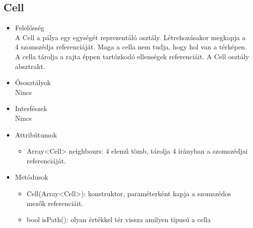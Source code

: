 \subsection{Cell}
\begin{itemize}
\item Felelősség\\
A Cell a pálya egy egységét reprezentáló osztály. Létrehozásakor megkapja a 4 szomszédja referenciáját. Maga a cella nem tudja, hogy hol van a térképen. A cella tárolja a rajta éppen tartózkodó ellenségek referenciáit. A Cell osztály absztrakt.
\item Ősosztályok\\
Nincs
\item Interfészek\\
Nincs
\item Attribútumok\\
	\begin{itemize}
		\item Array<Cell> neighbours: 4 elemű tömb, tárolja 4 irányban a szomszédjai referenciáját.

		
	\end{itemize}
\item Metódusok\\
	\begin{itemize}
		
		\item Cell(Array<Cell>): konstruktor, paraméterként kapja a szomszédos mezők referenciáit.
		\item bool isPath(): olyan értékkel tér vissza amilyen típusú a cella 
		
		
	\end{itemize}
\end{itemize}

